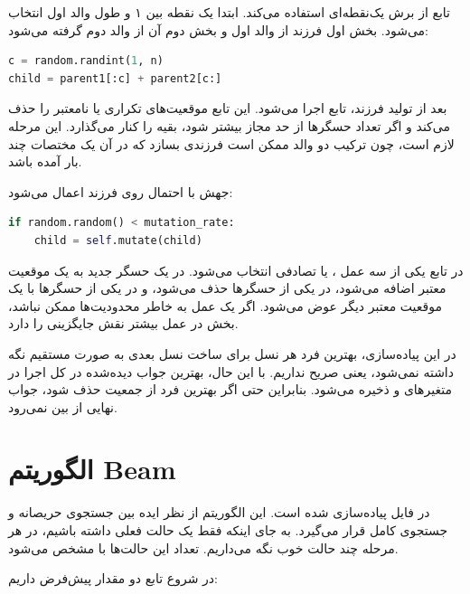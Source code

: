 \documentclass[10.5pt]{exam}
\begin{document}
تابع
از برش یک‌نقطه‌ای استفاده می‌کند. ابتدا یک نقطه
بین ۱ و طول والد اول انتخاب می‌شود. بخش اول فرزند از والد اول و بخش دوم آن از والد دوم گرفته می‌شود:

\begin{latin}
\begin{lstlisting}[language=Python]
c = random.randint(1, n)
child = parent1[:c] + parent2[c:]
\end{lstlisting}
\end{latin}

بعد از تولید فرزند، تابع
اجرا می‌شود. این تابع موقعیت‌های تکراری یا نامعتبر را حذف می‌کند و اگر تعداد حسگرها از حد مجاز بیشتر شود، بقیه را کنار می‌گذارد. این مرحله لازم است، چون ترکیب دو والد ممکن است فرزندی بسازد که در آن یک مختصات چند بار آمده باشد.

جهش با احتمال
روی فرزند اعمال می‌شود:

\begin{latin}
\begin{lstlisting}[language=Python]
if random.random() < mutation_rate:
    child = self.mutate(child)
\end{lstlisting}
\end{latin}

در تابع
یکی از سه عمل
،
یا
تصادفی انتخاب می‌شود. در
یک حسگر جدید به یک موقعیت معتبر اضافه می‌شود، در
یکی از حسگرها حذف می‌شود، و در
یکی از حسگرها با یک موقعیت معتبر دیگر عوض می‌شود. اگر یک عمل به خاطر محدودیت‌ها ممکن نباشد، بخش
در عمل بیشتر نقش جایگزینی را دارد.

در این پیاده‌سازی، بهترین فرد هر نسل برای ساخت نسل بعدی به صورت مستقیم نگه داشته نمی‌شود، یعنی
صریح نداریم. با این حال، بهترین جواب دیده‌شده در کل اجرا در متغیرهای
و
ذخیره می‌شود. بنابراین حتی اگر بهترین فرد از جمعیت حذف شود، جواب نهایی از بین نمی‌رود.

\section{الگوریتم Beam}
در فایل
پیاده‌سازی شده است. این الگوریتم از نظر ایده بین جستجوی حریصانه و جستجوی کامل قرار می‌گیرد. به جای اینکه فقط یک حالت فعلی داشته باشیم، در هر مرحله چند حالت خوب نگه می‌داریم. تعداد این حالت‌ها با
مشخص می‌شود.

در شروع تابع
دو مقدار پیش‌فرض داریم:
\end{document}
